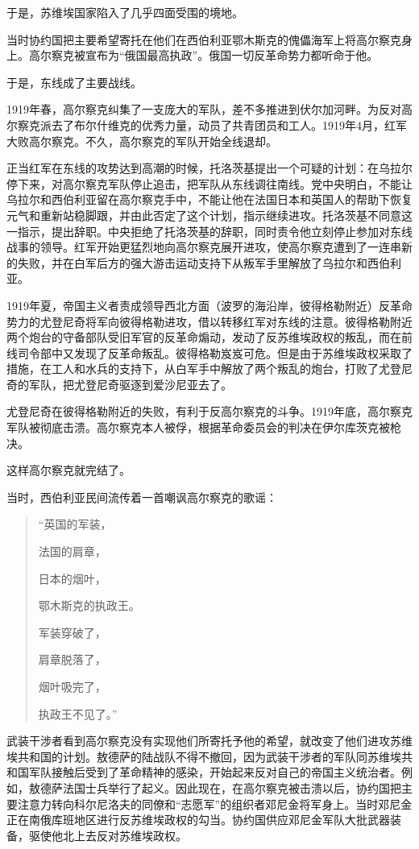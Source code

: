 于是，苏维埃国家陷入了几乎四面受围的境地。

当时协约国把主要希望寄托在他们在西伯利亚鄂木斯克的傀儡海军上将高尔察克身上。高尔察克被宣布为“俄国最高执政”。俄国一切反革命势力都听命于他。

于是，东线成了主要战线。

1919年春，高尔察克纠集了一支庞大的军队，差不多推进到伏尔加河畔。为反对高尔察克派去了布尔什维克的优秀力量，动员了共青团员和工人。1919年4月，红军大败高尔察克。不久，高尔察克的军队开始全线退却。

正当红军在东线的攻势达到高潮的时候，托洛茨基提出一个可疑的计划：在乌拉尔停下来，对高尔察克军队停止追击，把军队从东线调往南线。党中央明白，不能让乌拉尔和西伯利亚留在高尔察克手中，不能让他在法国日本和英国人的帮助下恢复元气和重新站稳脚跟，并由此否定了这个计划，指示继续进攻。托洛茨基不同意这一指示，提出辞职。中央拒绝了托洛茨基的辞职，同时责令他立刻停止参加对东线战事的领导。红军开始更猛烈地向高尔察克展开进攻，使高尔察克遭到了一连串新的失败，并在白军后方的强大游击运动支持下从叛军手里解放了乌拉尔和西伯利亚。

1919年夏，帝国主义者责成领导西北方面（波罗的海沿岸，彼得格勒附近）反革命势力的尤登尼奇将军向彼得格勒进攻，借以转移红军对东线的注意。彼得格勒附近两个炮台的守备部队受旧军官的反革命煽动，发动了反苏维埃政权的叛乱，而在前线司令部中又发现了反革命叛乱。彼得格勒岌岌可危。但是由于苏维埃政权采取了措施，在工人和水兵的支持下，从白军手中解放了两个叛乱的炮台，打败了尤登尼奇的军队，把尤登尼奇驱逐到爱沙尼亚去了。

尤登尼奇在彼得格勒附近的失败，有利于反高尔察克的斗争。1919年底，高尔察克军队被彻底击溃。高尔察克本人被俘，根据革命委员会的判决在伊尔库茨克被枪决。

这样高尔察克就完结了。

当时，西伯利亚民间流传着一首嘲讽高尔察克的歌谣：

\begin{quotation}
“英国的军装，

法国的肩章，

日本的烟叶，

鄂木斯克的执政王。

军装穿破了，

肩章脱落了，

烟叶吸完了，

执政王不见了。”
\end{quotation}

武装干涉者看到高尔察克没有实现他们所寄托予他的希望，就改变了他们进攻苏维埃共和国的计划。敖德萨的陆战队不得不撤回，因为武装干涉者的军队同苏维埃共和国军队接触后受到了革命精神的感染，开始起来反对自己的帝国主义统治者。例如，敖德萨法国士兵举行了起义。因此现在，在高尔察克被击溃以后，协约国把主要注意力转向科尔尼洛夫的同僚和“志愿军”的组织者邓尼金将军身上。当时邓尼金正在南俄库班地区进行反苏维埃政权的勾当。协约国供应邓尼金军队大批武器装备，驱使他北上去反对苏维埃政权。

